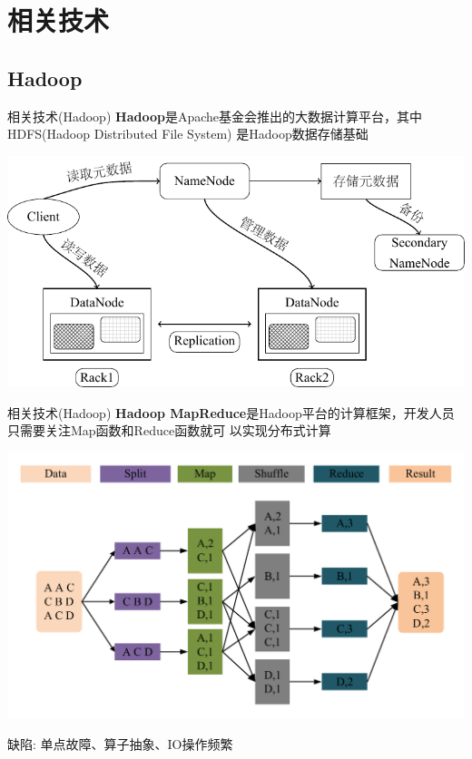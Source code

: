 \section{相关技术}

\subsection{Hadoop}

\begin{frame}[t]{相关技术(Hadoop)}
    \textbf{Hadoop}是Apache基金会推出的大数据计算平台，其中HDFS(Hadoop Distributed File System)
    是Hadoop数据存储基础

    \pause
    \includegraphics[scale=0.8]{figures/hdfs.pdf}
\end{frame}

\begin{frame}[t]{相关技术(Hadoop)}
    \textbf{Hadoop MapReduce}是Hadoop平台的计算框架，开发人员只需要关注Map函数和Reduce函数就可
    以实现分布式计算

    \pause
    \includegraphics[scale=0.4]{figures/mapreduce.pdf}

    \pause
    \alert{缺陷: }单点故障、算子抽象、IO操作频繁
\end{frame}

